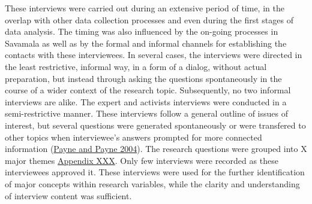 \documentclass[11pt]{report}
\begin{document}
These interviews were carried out during an extensive period of time, in the overlap with other data collection processes and even during the first stages of data analysis. The timing was also influenced by the on-going processes in Savamala as well as by the formal and informal channels for establishing the contacts with these interviewees. In several cases, the interviews were directed in the least restrictive, informal way, in a form of a dialog, without actual preparation, but instead through asking the questions spontaneously in the course of a wider context of the research topic. Subsequently, no two informal interviews are alike. The expert and activists interviews were conducted in a semi-restrictive manner. These interviews follow a general outline of issues of interest, but several questions were generated spontaneously or were transfered to other topics when interviewee's answers prompted for more connected information (\href{ref}{Payne and Payne 2004}). The research questions were grouped into X major themes \href{ref}{Appendix XXX}. Only few interviews were recorded as these interviewees approved it. These interviews were used for the further identification of major concepts within research variables, while the clarity and understanding of interview content was sufficient. 
\end{document}
